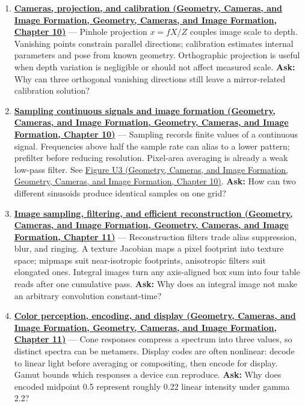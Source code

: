 \begin{enumerate}
\item
  \textbf{\href{../03-Geometry-Cameras-and-Image-Formation/main.pdf\#nameddest=03-visual-computing-i-ch003-cameras-projection-and-calibration}{Cameras, projection, and calibration (Geometry, Cameras, and Image Formation, Geometry, Cameras, and Image Formation, Chapter 10)}} --- Pinhole projection \(x=fX/Z\) couples image scale to depth. Vanishing points constrain parallel directions; calibration estimates internal parameters and pose from known geometry. Orthographic projection is useful when depth variation is negligible or should not affect measured scale. \textbf{Ask:} Why can three orthogonal vanishing directions still leave a mirror-related calibration solution?
\item
  \textbf{\href{../03-Geometry-Cameras-and-Image-Formation/main.pdf\#nameddest=03-visual-computing-i-ch003-sampling-continuous-signals-and-image-formation}{Sampling continuous signals and image formation (Geometry, Cameras, and Image Formation, Geometry, Cameras, and Image Formation, Chapter 10)}} --- Sampling records finite values of a continuous signal. Frequencies above half the sample rate can alias to a lower pattern; prefilter before reducing resolution. Pixel-area averaging is already a weak low-pass filter. See \href{../03-Geometry-Cameras-and-Image-Formation/main.pdf\#nameddest=03-visual-computing-i-ch003-figure-u3---two-signals-can-share-the-same-samples}{Figure U3 (Geometry, Cameras, and Image Formation, Geometry, Cameras, and Image Formation, Chapter 10)}. \textbf{Ask:} How can two different sinusoids produce identical samples on one grid?
\item
  \textbf{\href{../03-Geometry-Cameras-and-Image-Formation/main.pdf\#nameddest=03-visual-computing-i-ch004-image-sampling-filtering-and-efficient-reconstruction}{Image sampling, filtering, and efficient reconstruction (Geometry, Cameras, and Image Formation, Geometry, Cameras, and Image Formation, Chapter 11)}} --- Reconstruction filters trade alias suppression, blur, and ringing. A texture Jacobian maps a pixel footprint into texture space; mipmaps suit near-isotropic footprints, anisotropic filters suit elongated ones. Integral images turn any axis-aligned box sum into four table reads after one cumulative pass. \textbf{Ask:} Why does an integral image not make an arbitrary convolution constant-time?
\item
  \textbf{\href{../03-Geometry-Cameras-and-Image-Formation/main.pdf\#nameddest=03-visual-computing-i-ch004-color-perception-encoding-and-display}{Color perception, encoding, and display (Geometry, Cameras, and Image Formation, Geometry, Cameras, and Image Formation, Chapter 11)}} --- Cone responses compress a spectrum into three values, so distinct spectra can be metamers. Display codes are often nonlinear: decode to linear light before averaging or compositing, then encode for display. Gamut bounds which responses a device can reproduce. \textbf{Ask:} Why does encoded midpoint 0.5 represent roughly 0.22 linear intensity under gamma 2.2?

\end{enumerate}
